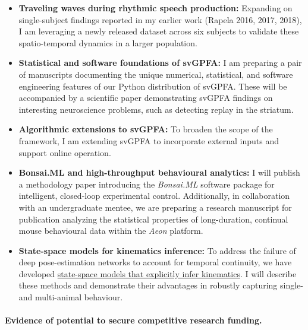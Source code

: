 \documentclass{article}
\begin{document}
\begin{itemize}

    \item\textbf{Traveling waves during rhythmic speech production:} Expanding
        on single-subject findings reported in my earlier work (Rapela 2016,
        2017, 2018), I am leveraging a newly released dataset across six
        subjects to validate these spatio-temporal dynamics in a larger
        population.

    \item\textbf{Statistical and software foundations of svGPFA:} I am
        preparing a pair of manuscripts documenting the unique numerical,
        statistical, and software engineering features of our Python
        distribution of svGPFA. These will be accompanied by
        a scientific paper demonstrating svGPFA findings on
        interesting neuroscience problems, such as detecting replay in the
        striatum.

    \item\textbf{Algorithmic extensions to svGPFA:} To broaden the scope of the
        framework, I am extending svGPFA to incorporate external inputs and
        support online operation.

    \item \textbf{Bonsai.ML and high-throughput behavioural analytics:} I will
        publish a methodology paper introducing the \textit{Bonsai.ML} software
        package for intelligent, closed-loop experimental control.
        Additionally, in collaboration with an undergraduate mentee, we are
        preparing a research manuscript for publication analyzing the
        statistical properties of long-duration, continual mouse behavioural
        data within the \textit{Aeon} platform.

    \item\textbf{State-space models for kinematics inference:} To address the
        failure of deep pose-estimation networks to account for temporal
        continuity, we have developed
        \href{https://joacorapela.github.io/ssm/auto_examples/index.html#kinematics-inference}{state-space
        models that explicitly infer kinematics}. I will describe these methods
        and demonstrate their advantages in robustly capturing single- and
        multi-animal behaviour.

\end{itemize}

\paragraph{Evidence of potential to secure competitive research funding.}
\end{document}
